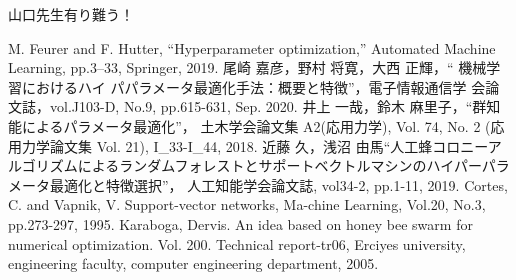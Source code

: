 \documentclass[12pt, dvipdfmx]{jarticle}
\numberwithin{equation}{section}
\begin{document}

\tableofcontents %
\clearpage %

\clearpage %
\clearpage
\clearpage
\clearpage
\clearpage

\clearpage
\clearpage

山口先生有り難う！ %
\clearpage

\begin{thebibliography}{99} %
M. Feurer and F. Hutter, “Hyperparameter optimization,” Automated Machine Learning, pp.3–33, Springer, 2019.
尾崎 嘉彦，野村 将寛，大西 正輝，“ 機械学習におけるハイ
パパラメータ最適化手法：概要と特徴”，電子情報通信学
会論文誌，vol.J103-D, No.9, pp.615-631, Sep. 2020.
井上 一哉，鈴木 麻里子，“群知能によるパラメータ最適化”，
土木学会論文集 A2(応用力学), Vol. 74, No. 2 (応用力学論文集 Vol. 21), I\_33-I\_44, 2018.
近藤 久，浅沼 由馬“人工蜂コロニーアルゴリズムによるランダムフォレストとサポートベクトルマシンのハイパーパラメータ最適化と特徴選択”，
人工知能学会論文誌, vol34-2, pp.1-11, 2019.
Cortes, C. and Vapnik, V. Support-vector networks, Ma-chine Learning, Vol.20, No.3, pp.273-297, 1995.
Karaboga, Dervis. An idea based on honey bee swarm for numerical optimization. Vol. 200. 
Technical report-tr06, Erciyes university, engineering faculty, computer engineering department, 2005.
\end{thebibliography} %
\end{document}
